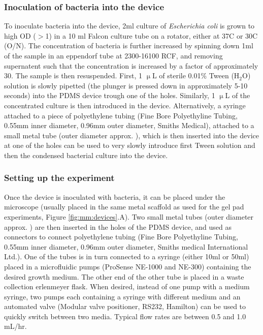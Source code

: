 \subsubsection{Inoculation of bacteria into the device}
To inoculate bacteria into the device, 2ml culture of \textit{Escherichia coli} is grown to high OD ($>$1) in a 10 ml Falcon culture tube on a rotator, either at 37C or 30C (O/N). 
The concentration of bacteria is further increased by spinning down 1ml of the sample in an eppendorf tube at 2300-16100 RCF, and removing supernatent such that the concentration is increased by a factor of approximately 30. The sample is then resuspended.
%
First, 1 $\upmu$L of sterile 0.01\% Tween ($\text{H}_2\text{O}$) solution is slowly pipetted (the plunger is pressed down in approximately 5-10 seconds) into the PDMS device trough one of the holes.
Similarly, 1 $\upmu$L of the concentrated culture is then introduced in the device.
%
Alternatively, a syringe attached to a piece of polyethylene tubing (Fine Bore Polyethyline Tubing, 0.55mm inner diameter, 0.96mm outer diameter, Smiths Medical), attached to a small metal tube (outer diameter approx. \red{0.65mm}), which is then inserted into the device at one of the holes can be used to very slowly introduce first Tween solution and then the condensed bacterial culture into the device.

\subsubsection{Setting up the experiment}
Once the device is inoculated with bacteria, it can be placed under the microscope (usually placed in the same metal scaffold as used for the gel pad experiments, Figure \ref{fig:mm:devices}.A). 
Two small metal tubes (outer diameter approx. \red{0.65mm}) are then inserted in the holes of the PDMS device, and used as connectors to connect polyethylene tubing (Fine Bore Polyethyline Tubing, 0.55mm inner diameter, 0.96mm outer diameter, Smiths medical International Ltd.).
One of the tubes is in turn connected to a syringe (either 10ml or 50ml) placed in a microfluidic pumps (ProSense NE-1000 and NE-300) containing the desired growth medium.
The other end of the other tube is placed in a waste collection erlenmeyer flask.
When desired, instead of one pump with a medium syringe, two pumps each containing a syringe with different medium and an automated valve (Modular valve positioner, RS232, Hamilton) can be used to quickly switch between two media.
Typical flow rates are between 0.5 and 1.0 mL/hr.

